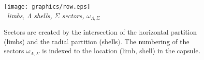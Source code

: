 \begin{figure}
   \centering
   \texttt{[image: graphics/row.eps]}  \\ \
   \emph{limbs, $\Lambda$} \qquad \qquad \qquad \qquad \qquad
   \emph{shells, $\Sigma$} \qquad \qquad \qquad \qquad \qquad
   \emph{sectors, $\omega_{\Lambda,\Sigma}$} \\[10pt]
   \caption{Sectors are created by the intersection of the horizontal partition (limbs) and the radial partition (shells). The numbering of the sectors $\omega_{\Lambda,\Sigma}$ is indexed to the location (limb, shell) in the capsule.}
   \label{fig:partition intersection}
\end{figure}

\endinput  %